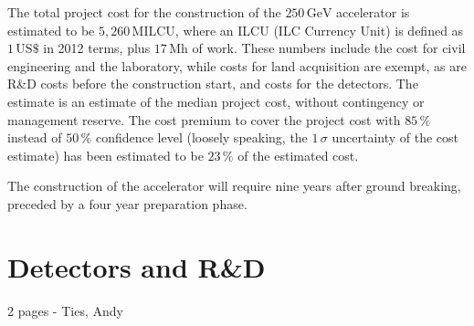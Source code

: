 \documentclass[%
 reprint,
 amsmath,amssymb,
 aps,
]{revtex4-1}
\begin{document}
The total project cost for the construction of the $250\,{\mathrm{GeV}}$ accelerator is estimated to be $5,260\,{\mathrm{MILCU}}$, where an ILCU (ILC Currency Unit) is defined as $1\,{\mathrm{US\$}}$ in 2012 terms, plus $17\,{\mathrm{Mh}}$ of work. 
These numbers include the cost for civil engineering and the laboratory, while costs for land acquisition are exempt, as are R\&D costs before the construction start, and costs for the detectors.
The estimate is an estimate of the median project cost, without contingency or management reserve.
The cost premium to cover the project cost with $85\,\%$ instead of $50\,\%$ confidence level (loosely speaking, the $1\,\sigma$ uncertainty of the cost estimate) has been estimated to be $23\,\%$ of the estimated cost.

The construction of the accelerator will require nine years after ground breaking, preceded by a four year preparation phase.

\section{\label{sec:detect}Detectors and R\&D}

2 pages - Ties, Andy
\end{document}

